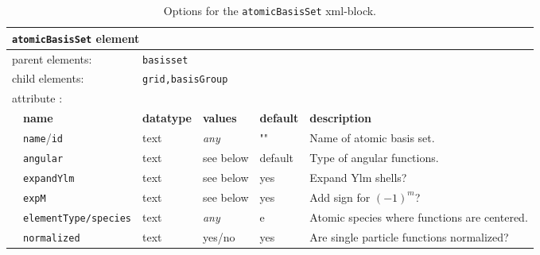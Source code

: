 \begin{table}[h]
\begin{center}
\begin{tabularx}{\textwidth}{l l l l l l }
\hline
\multicolumn{6}{l}{\texttt{atomicBasisSet} element} \\
\hline
\multicolumn{2}{l}{parent elements:} & \multicolumn{4}{l}{\texttt{basisset}}\\
\multicolumn{2}{l}{child  elements:} & \multicolumn{4}{l}{\texttt{grid,basisGroup}}\\
\multicolumn{2}{l}{attribute      :} & \multicolumn{4}{l}{}\\
   &   \bfseries name              & \bfseries datatype & \bfseries values & \bfseries default   & \bfseries description \\
   &   \texttt{name}/\texttt{id}   &  text              &  \textit{any}    &  ""                & Name of atomic basis set. \\
   &   \texttt{angular}               &  text              &  see below    &  default       & Type of angular functions.  \\
   &   \texttt{expandYlm}         &  text              &  see below   &  yes                &  Expand Ylm shells? \\  
   &   \texttt{expM}                  &  text              &  see below   &  yes                &  Add sign for $(-1)^{m}$? \\  
   &   \texttt{elementType/species}   &  text  &  \textit{any}    &  e                &  Atomic species where functions are centered. \\
   &   \texttt{normalized}         &  text              &  yes/no   &  yes                &  Are single particle functions normalized? \\   
  \hline
\end{tabularx}
\end{center}
\caption{Options for the \texttt{atomicBasisSet} xml-block.}
\label{table:atomicBasisSet}
\end{table}

